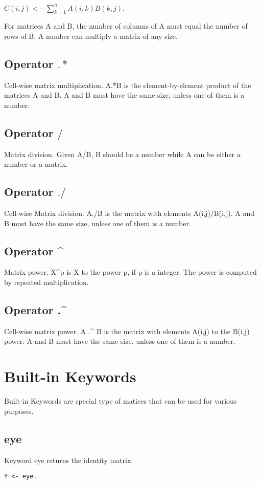 \documentclass[prodmode,acmtecs]{acmsmall}
\begin{document}
$C(i,j) <- \displaystyle\sum\limits_{k=1}^n A(i,k)B(k,j).$

For matrices A and B, the number of columns of A must equal the number of
rows of B. A number can multiply a matrix of any size.
\medskip

\subsection{Operator $.*$}
Cell-wise matrix multiplication. A.*B is the element-by-element product
of the matrices A and B. A and B must have the same size, unless one of
them is a number.
\medskip

\subsection{Operator $/$}
Matrix division. Given A/B, B should be a number while A can be either a
number or a matrix.
\medskip

\subsection{Operator $./$}
Cell-wise Matrix division. A./B is the matrix with elements A(i,j)/B(i,j).
A and B must have the same size, unless one of them is a number.
\medskip

\subsection{Operator \^{}}
Matrix power. X\^{}p is X to the power p, if p is a integer. The power
is computed by repeated multiplication.
\medskip

\subsection{Operator .\^{}}
Cell-wise matrix power. A .\^{} B is the matrix with elements A(i,j) to
the B(i,j) power. A and B must have the same size, unless one of them
is a number.

\section{Built-in Keywords}
Built-in Keywords are special type of matices that can be used for
various purposes.
\medskip

\subsection{eye}
Keyword eye returns the identity matrix.
\begin{lstlisting}
Y <- eye.
\end{lstlisting}
\end{document}
